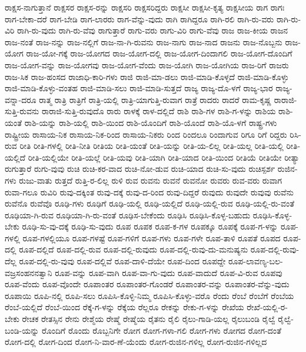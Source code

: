 {ರಾಕ್ಷಸ-ನಾಗುತ್ತಾನೆ
ರಾಕ್ಷಸರ
ರಾಕ್ಷಸ-ರನ್ನು
ರಾಕ್ಷಸರಿ
ರಾಕ್ಷಸರಿದ್ದರು
ರಾಕ್ಷಸೀ
ರಾಕ್ಷಸೀ-ಕೃತ್ಯ
ರಾಕ್ಷಸೀಯ
ರಾಗ
ರಾಗಃ
ರಾಗ-ಬೇಕಾ-ದರೆ
ರಾಗ-ಬೇಡಿ
ರಾಗ-ಲಾರರು
ರಾಗ-ವೆನ್ನು-ವುದು
ರಾಗಿ
ರಾಗಿದ್ದರೂ
ರಾಗಿ-ರಲಿ
ರಾಗಿ-ರು-ವರು
ರಾಗಿ-ರು-ವಿರಿ
ರಾಗಿ-ರು-ವುದು
ರಾಗಿ-ರು-ವೆವು
ರಾಗುತ್ತಾರೆ
ರಾಗು-ವರು
ರಾಗು-ವಿರಿ
ರಾಗು-ವೆವು
ರಾಜ
ರಾಜ-ಕೀಯ
ರಾಜನ
ರಾಜ-ನಂತೆ
ರಾಜ-ನನ್ನು
ರಾಜ-ನಲ್ಲಿಗೆ
ರಾಜ-ನಾ-ಗಿ-ರುವನು
ರಾಜ-ನಾಗು
ರಾಜ-ನಾದ
ರಾಜನು
ರಾಜ-ನೊಬ್ಬನು
ರಾಜ-ಯೋಗ
ರಾಜ-ಯೋ-ಗಕ್ಕೆ
ರಾಜ-ಯೋಗದ
ರಾಜ-ಯೋಗ-ದಲ್ಲಿ
ರಾಜ-ಯೋಗ-ದಿಂದಾಗಲಿ
ರಾಜ-ಯೋಗ-ದೊಂದಿಗೆ
ರಾಜ-ಯೋಗ-ವನ್ನು
ರಾಜ-ಯೋಗವು
ರಾಜ-ಯೋಗ-ವೆಂದು
ರಾಜ-ಯೋಗಿ
ರಾಜ-ಯೋಗಿಯ
ರಾಜ-ರಿಗೆ
ರಾಜರು
ರಾಜ-ಸಿಕ
ರಾಜ-ಹಂಸದ
ರಾಜಾಧಿ-ಕಾರಿ-ಗಳು
ರಾಜಿ
ರಾಜಿ-ಮಾ-ಡಲು
ರಾಜಿ-ಮಾಡಿ-ಕೊಳ್ಳದೆ
ರಾಜಿ-ಮಾಡಿ-ಕೊಳ್ಳು
ರಾಜಿ-ಮಾಡಿ-ಕೊಳ್ಳು-ವಂತಹ
ರಾಜಿ-ಮಾಡಿ-ಸಲು
ರಾಜಿ-ಮಾಡಿ-ಸುತ್ತದೆ
ರಾಜ್ಯ
ರಾಜ್ಯ-ದೊ-ಳಗೆ
ರಾಜ್ಯ-ಭಾರ
ರಾಜ್ಯ-ವನ್ನಾ-ದರೂ
ರಾತ್ಮ
ರಾತ್ರಿ
ರಾತ್ರಿಗೆ
ರಾತ್ರಿ-ಯಲ್ಲಿ
ರಾತ್ರಿ-ಯಾಗುತ್ತಿ-ರುವಾಗ
ರಾತ್ರೆ
ರಾದರು
ರಾದರೆ
ರಾಮ-ಕೃಷ್ಣ
ರಾರಾಜಿ-ಸುತ್ತಿ-ರುವನು
ರಾರಾಜಿ-ಸುತ್ತಿ-ರುವುದೊ
ರಾರು
ರಾಳಕ್ಕೆ
ರಾಳ-ದಲ್ಲಿದೆ
ರಾಶಿ
ರಾಶಿ-ಗಳ
ರಾಶಿ-ಗ-ಳನ್ನು
ರಾಶಿಯ
ರಾಶಿ-ಯಂತೆ
ರಾಶಿ-ಯನ್ನು
ರಾಶಿ-ಯಲ್ಲಿ
ರಾಶಿ-ಯಿಂದ
ರಾಶಿ-ಯೊಂದಿಗೆ
ರಾಶಿ-ಯೊಂದೆ
ರಾಶಿ-ಯೊ-ಳಗೆ
ರಾಷ್ಟ್ರ-ಗಳು
ರಾಷ್ಟ್ರೀಯ
ರಾಸಾಯ-ನಿಕ
ರಾಸಾಯ-ನಿಕ-ರಿಂದ
ರಾಸಾಯ-ನಿಕರು
ರಿಂದ
ರಿಂದಲೂ
ರಿಂದಾಗುವ
ರಿಗೂ
ರಿಗೆ
ರಿದ್ದರು
ರಿಸಿ-ರುವ
ರೀತಿ
ರೀತಿ-ಗಳಲ್ಲಿ
ರೀತಿ-ನೀತಿ
ರೀತಿಯ
ರೀತಿ-ಯಂತೆ
ರೀತಿ-ಯನ್ನು
ರೀತಿ-ಯ-ಲಿಲ್ಲ
ರೀತಿ-ಯಲ್ಲ
ರೀತಿ-ಯಲ್ಲಿ
ರೀತಿ-ಯಲ್ಲಿದೆ
ರೀತಿ-ಯಲ್ಲಿಯೇ
ರೀತಿ-ಯಲ್ಲೆ
ರೀತಿ-ಯವು
ರೀತಿ-ಯಾಗಿ
ರೀತಿ-ಯಾದ
ರೀತಿ-ಯಿಂದ
ರೀತಿಯೆ
ರೀತಿಯೇ
ರೀತ್ಯಾ
ರುಗುತ್ತಾರೆ
ರುಗು-ವುವು
ರುಚಿ
ರುಚಿ-ಕರ-ವಾದ
ರುಚಿ-ನೋ-ಡುವ
ರುಚಿ-ಯಾದ
ರುಚಿ-ಸು-ವುದು
ರುಚಿಸ್ಪರ್ಶ
ರುಜಿನ-ಗಳು
ರುಜು-ವಾತು
ರುತ್ತದೆ
ರುತ್ತಿ-ರ-ಲಿಲ್ಲ
ರುಳಿ
ರುವ
ರುವನು
ರುವನೆ
ರುವನೋ
ರುವರು
ರುವ-ವರು
ರುವಾಗ
ರುವಾ-ಗಲೂ
ರುವಿರಿ
ರುವು-ದಕ್ಕಿಂತ
ರುವು-ದಕ್ಕೆ
ರುವು-ದ-ರಿಂದ
ರುವು-ದಿದ್ದರೆ
ರುವುದು
ರುವುದೇ
ರುವುವು
ರುವೆನು
ರುವೆನೊ
ರುವೆವೊ
ರೂಢಿ-ಗಳು
ರೂಢಿಗೆ
ರೂಢಿ-ಯಲ್ಲಿ
ರೂಢಿ-ಯಲ್ಲಿದೆ
ರೂಢಿ-ಯಲ್ಲಿ-ರುವ
ರೂಢಿ-ಯಲ್ಲಿ-ರು-ವಂತೆ
ರೂಢಿಯಾ-ಗಿ-ರುವ
ರೂಢಿಯಾ-ಗಿ-ರು-ವಂತೆ
ರೂಢಿಸ-ಬೇಕೆಂದು
ರೂಢಿಸಿ
ರೂಢಿಸಿ-ಕೊಳ್ಳ-ಬಹುದು
ರೂಢಿಸಿ-ಕೊಳ್ಳ-ಬೇಕು
ರೂಢಿ-ಸು-ವು-ದಕ್ಕೆ
ರೂಢಿ-ಸು-ವುದು
ರೂಪ
ರೂಪಕ
ರೂಪ-ಕ-ಗಳ
ರೂಪಕ್ಕೂ
ರೂಪಕ್ಕೆ
ರೂಪ-ಗ-ಳನ್ನು
ರೂಪ-ಗಳಲ್ಲಿ
ರೂಪ-ಗಳಲ್ಲಿಯೂ
ರೂಪ-ಗಳಷ್ಟೆ
ರೂಪ-ಗಳಿಗೆ
ರೂಪ-ಗಳು
ರೂಪ-ಗಳೇ
ರೂಪ-ತಾಳಿ
ರೂಪತೆ
ರೂಪದ
ರೂಪ-ದಲ್ಲಿ
ರೂಪ-ದಲ್ಲಿದೆ
ರೂಪ-ದಲ್ಲಿ-ರುವ
ರೂಪ-ದಲ್ಲಿ-ರುವುದು
ರೂಪ-ದಲ್ಲಿ-ರುವು-ದು-ಮನುಷ್ಯನು
ರೂಪ-ದಲ್ಲಿ-ರುವು-ದೆಲ್ಲ
ರೂಪ-ದಲ್ಲಿ-ರು-ವುವು
ರೂಪ-ದಲ್ಲಿವೆ
ರೂಪ-ದಾಳಿ-ದೆಯೇ
ರೂಪ-ದಿಂದ
ರೂಪದ್ದೇ
ರೂಪ-ಲಾವಣ್ಯ-ಬಲ-ವಜ್ರಸಂಹನನತ್ವಾನಿ
ರೂಪ-ವನ್ನು
ರೂಪ-ವಾಗಿ
ರೂಪ-ವಾ-ಗು-ವುದು
ರೂಪ-ವಾದುದೆ
ರೂಪ-ವಿ-ರುವ
ರೂಪವು
ರೂಪ-ವೆಂದು
ರೂಪ-ವೊಂದೇ
ರೂಪಾಂತರ
ರೂಪಾಂತರ-ಗೊಂಡರೆ
ರೂಪಾಂತರ-ವನ್ನು
ರೂಪಾಂತರ-ವೆನ್ನು-ವುದು
ರೂಪಾಯಿ
ರೂಪಿ-ನಲ್ಲಿ
ರೂಪಿ-ಸಲು
ರೂಪಿಸಿ-ಕೊಳ್ಳಿ-ನಿಮ್ಮ
ರೂಪಿಸಿ-ಕೊಳ್ಳು-ವರೊ
ರೆಂದು
ರೆಂಬೆ
ರೆಂಬೆಗೆ
ರೆಂಬೆಯ
ರೆಂಬೆ-ಯಲ್ಲಿದೆ
ರೆಂಬೆ-ಯಿಂದ
ರೆಕ್ಕೆ-ಗ-ಳನ್ನು
ರೆಕ್ಕೆಯ
ರೆಲ್ಲರೂ
ರೇಕನ್ನು
ರೇಕು-ಗ-ಳನ್ನು
ರೇಖೆಯ
ರೇಖೆ-ಯಲ್ಲಿ-ರ-ಬೇಕು
ರೇಚಕ
ರೇತಸ್ಸಿನ
ರೇನು
ರೇಶ್ಮೆಯ
ರೇಷ್ಮೆ
ರೇಷ್ಮೆಯ
ರೈತನು
ರೈಲಿ
ರೈಲು-ಗಾಡಿ-ಯಲ್ಲ
ರೈಲುಬಂಡಿ
ರೈಲ್ವೆ
ರೈಲ್ವೆ-ಬಂಡಿ-ಯನ್ನು
ರೊಂದಿಗೆ
ರೊಂದು
ರೊಬ್ಬನಿಗೇ
ರೋಗ
ರೋಗ-ಗಳಾ-ಗಲಿ
ರೋಗ-ಗಳು
ರೋಗದ
ರೋಗ-ದಂತೆ
ರೋಗ-ದಲ್ಲಿ
ರೋಗ-ದಿಂದ
ರೋಗ-ನಿ-ವಾರ-ಣೆ-ಯೆಂದು
ರೋಗ-ರುಜಿನ-ಗಳಿಲ್ಲ
ರೋಗ-ರುಜಿನ-ಗಳಿಲ್ಲದ
}
